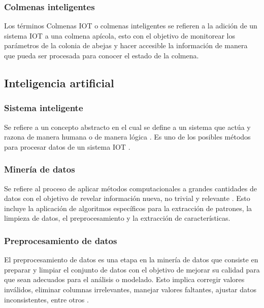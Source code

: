 \subsubsection{Colmenas inteligentes}
Los términos Colmenas IOT o colmenas inteligentes se refieren a la adición de un sistema IOT a una colmena apícola, esto con el objetivo de monitorear los parámetros de la colonia de abejas y hacer accesible la información de manera que pueda ser procesada para conocer el estado de la colmena. \cite{open_source_beehives_project_iaac}

\subsection{Inteligencia artificial}

\subsubsection{Sistema inteligente}
Se refiere a un concepto abstracto en el cual se define a un sistema que actúa y razona de manera humana o de manera lógica \cite{russell_norvig_2022}. Es uno de los posibles métodos para procesar datos de un sistema IOT \cite{open_source_beehives_project_iaac}.

\subsubsection{Minería de datos}
Se refiere al proceso de aplicar métodos computacionales a grandes cantidades de datos con el objetivo de revelar información nueva, no trivial y relevante \cite{fayyad1996kdd}. Esto incluye la aplicación de algoritmos específicos para la extracción de patrones, la limpieza de datos, el preprocesamiento y la extracción de características.


\subsubsection{Preprocesamiento de datos}
El preprocesamiento de datos es una etapa en la minería de datos que consiste en preparar y limpiar el conjunto de datos con el objetivo de mejorar su calidad para que sean adecuados para el análisis o modelado. Esto implica corregir valores inválidos, eliminar columnas irrelevantes, manejar valores faltantes, ajustar datos inconsistentes, entre otros \cite{statistical_modeling_in_machine_learning_2023}.

